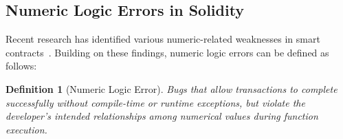 \documentclass[pdflatex,sn-basic]{sn-jnl}%
\theoremstyle{thmstyleone}%
\theoremstyle{thmstyletwo}%
\theoremstyle{thmstylethree}%
\newtheorem{definition}{Definition}%
\begin{document}
\subsection{Numeric Logic Errors in Solidity}

Recent research has identified various numeric-related weaknesses in smart contracts~\citep{numscout,gptscan,flyinointment,exploitablebugs,defiattacks}.
Building on these findings, numeric logic errors can be defined as follows:

\begin{definition}[Numeric Logic Error]
Bugs that allow transactions to complete successfully without compile-time or runtime exceptions,
but violate the developer's intended relationships among numerical values during function execution.
\end{definition}
\end{document}
